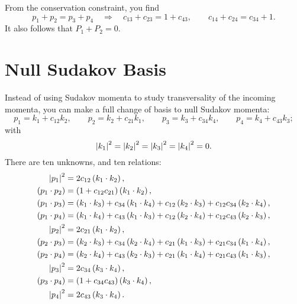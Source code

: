 From the conservation constraint, you find
\begin{equation}
	p_{1} + p_{2} = p_{3} + p_{4} \quad \Longrightarrow \quad c_{13} + c_{23} = 1 + c_{43}, \qquad c_{14} + c_{24} = c_{34} + 1.
\end{equation}
It also follows that $P_{1} + P_{2} = 0$.
\section{Null Sudakov Basis}
Instead of using Sudakov momenta to study transversality of the incoming momenta, you can make a full change of basis to null Sudakov momenta:
\begin{equation}
	p_{1} = k_{1} + c_{12} k_{2}, \qquad p_{2} = k_{2} + c_{21} k_{1}, \qquad p_{3} = k_{3} + c_{34} k_{4}, \qquad p_{4} = k_{4} + c_{43} k_{3};
\end{equation}
with
\begin{equation}
	\left\lvert k_{1} \right\rvert^{2} = \left\lvert k_{2} \right\rvert^{2} = \left\lvert k_{3} \right\rvert^{2} = \left\lvert k_{4} \right\rvert^{2} = 0.
\end{equation}
There are ten unknowns, and ten relations:
\begin{align}
	\left\lvert p_{1} \right\rvert^{2} &= 2 c_{12} \left( k_{1} \cdot k_{2} \right), \\
	\left( p_{1} \cdot p_{2} \right) &= \left(1 + c_{12}c_{21} \right) \left( k_{1} \cdot k_{2} \right), \\
	\left( p_{1} \cdot p_{3} \right) &= \left( k_{1} \cdot k_{3} \right) + c_{34} \left( k_{1} \cdot k_{4} \right) + c_{12} \left( k_{2} \cdot k_{3} \right) + c_{12} c_{34} \left( k_{2} \cdot k_{4} \right), \\
	\left( p_{1} \cdot p_{4} \right) &= \left( k_{1} \cdot k_{4} \right) + c_{43} \left( k_{1} \cdot k_{3} \right) + c_{12} \left( k_{2} \cdot k_{4} \right) + c_{12} c_{43} \left( k_{2} \cdot k_{3} \right), \\
	\left\lvert p_{2} \right\rvert^{2} &= 2 c_{21} \left( k_{1} \cdot k_{2} \right), \\
	\left( p_{2} \cdot p_{3} \right) &= \left( k_{2} \cdot k_{3} \right) + c_{34} \left( k_{2} \cdot k_{4} \right) + c_{21} \left( k_{1} \cdot k_{3} \right) + c_{21} c_{34} \left( k_{1} \cdot k_{4} \right), \\
	\left( p_{2} \cdot p_{4} \right) &= \left( k_{2} \cdot k_{4} \right) + c_{43} \left( k_{2} \cdot k_{3} \right) + c_{21} \left( k_{1} \cdot k_{4} \right) + c_{21} c_{43} \left( k_{1} \cdot k_{3} \right), \\
	\left\lvert p_{3} \right\rvert^{2} &= 2 c_{34} \left( k_{3} \cdot k_{4} \right), \\
	\left( p_{3} \cdot p_{4} \right) &= \left(1 + c_{34}c_{43} \right) \left( k_{3} \cdot k_{4} \right), \\
	\left\lvert p_{4} \right\rvert^{2} &= 2 c_{43} \left( k_{3} \cdot k_{4} \right).
\end{align}
